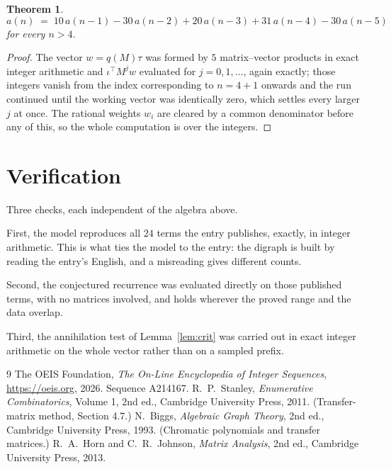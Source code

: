 \documentclass[11pt,a4paper]{article}
\theoremstyle{plain}
\newtheorem{theorem}{Theorem}
\theoremstyle{definition}
\begin{document}
\begin{theorem}
\[
a(n)\;=\;10\,a(n-1) - 30\,a(n-2) + 20\,a(n-3) + 31\,a(n-4) - 30\,a(n-5)
\]
for every $n>4$.
\end{theorem}

\begin{proof}
The vector $w=q(M)\tau$ was formed by $5$ matrix--vector products in exact integer
arithmetic and $\iota^{\!\top}M^{j}w$ evaluated for $j=0,1,\dots$, again exactly; those
integers vanish from the index corresponding to $n=4+1$ onwards and the run continued
until the working vector was identically zero, which settles every larger $j$ at once. The
rational weights $w_i$ are cleared by a common denominator before any of this, so the whole
computation is over the integers.
\end{proof}

\section{Verification}

Three checks, each independent of the algebra above.

First, the model reproduces all $24$ terms the entry publishes, exactly, in integer
arithmetic. This is what ties the model to the entry: the digraph is built by reading the
entry's English, and a misreading gives different counts.

Second, the conjectured recurrence was evaluated directly on those published terms, with no
matrices involved, and holds wherever the proved range and the data overlap.

Third, the annihilation test of Lemma~\ref{lem:crit} was carried out in exact integer
arithmetic on the whole vector rather than on a sampled prefix.

\begin{thebibliography}{9}
 The OEIS Foundation, \emph{The On-Line Encyclopedia of Integer
Sequences}, \url{https://oeis.org}, 2026. Sequence A214167.
 R.~P.~Stanley, \emph{Enumerative Combinatorics}, Volume 1, 2nd ed.,
Cambridge University Press, 2011. (Transfer-matrix method, Section 4.7.)
 N.~Biggs, \emph{Algebraic Graph Theory}, 2nd ed., Cambridge University
Press, 1993. (Chromatic polynomials and transfer matrices.)
 R.~A.~Horn and C.~R.~Johnson, \emph{Matrix Analysis}, 2nd ed., Cambridge
University Press, 2013.
\end{thebibliography}
\end{document}
